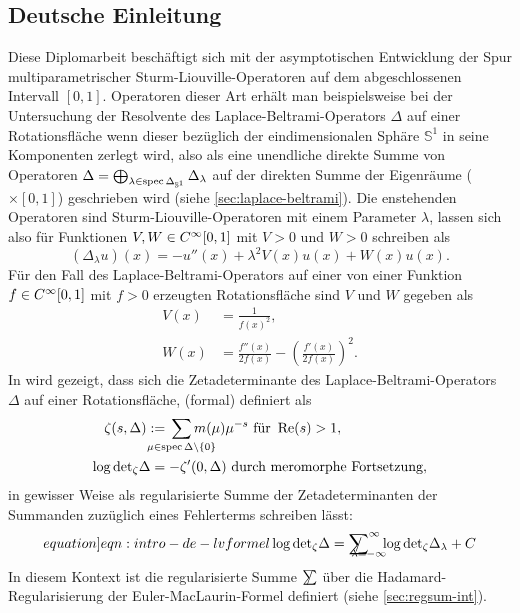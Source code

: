 \subsection{Deutsche Einleitung}
Diese Diplomarbeit beschäftigt sich mit der asymptotischen Entwicklung der Spur
multiparametrischer Sturm-Liouville-Operatoren auf dem abgeschlossenen Intervall
$[0,1]$.
%
Operatoren dieser Art erhält man beispielsweise bei der Untersuchung der
Resolvente des Laplace-Beltrami-Operators $\Delta$ auf einer Rotationsfläche
wenn dieser bezüglich der eindimensionalen Sphäre $\mathbb{S}^1$ in seine
Komponenten zerlegt wird, also als eine unendliche direkte Summe von Operatoren
$\Delta =
\bigoplus_{\lambda\in\operatorname{spec}\Delta_{{\mathbb{S}^{1}}}}\Delta_\lambda$ auf
der direkten Summe der Eigenräume ($\times[0,1]$) geschrieben wird (siehe
\cref{sec:laplace-beltrami}).
%
Die enstehenden Operatoren sind Sturm-Liouville-Operatoren mit einem Parameter
$\lambda$, lassen sich also für Funktionen $V,W\in C^\infty_{}{[0,1]}$ mit $V > 0$
und $W > 0$ schreiben als
\begin{equation*}
  (\Delta_\lambda u)(x) = -u''(x) + \lambda^2 V(x) u(x) + W(x) u(x).
\end{equation*}
Für den Fall des Laplace-Beltrami-Operators auf einer von einer Funktion
$f\in C^\infty_{}{[0,1]}$ mit $f>0$ erzeugten Rotationsfläche sind $V$ und $W$ gegeben
als
\begin{align*}
  V(x) &= \frac1{f(x)^2}, \\
  W(x) &= \frac{f''(x)}{2f(x)} - \left(\frac{f'(x)}{2f(x)}\right)^2.
\end{align*}
In \cite{LV13} wird gezeigt, dass sich die Zetadeterminante des
Laplace-Beltrami-Operators $\Delta$ auf einer Rotationsfläche, (formal) definiert
als
\begin{align*}
  \zeta(s,\Delta) := {} &
  \sum_{\mathclap{\mu\in\operatorname{spec}\Delta\setminus\{0\}}}
  m(\mu)\mu^{-s} \text{ für } \Re(s) > 1, \\
  \log\zdet \Delta = {} & {-\zeta'}(0,\Delta) \text{ durch meromorphe
Fortsetzung},
\end{align*}
in gewisser Weise als regularisierte Summe der Zetadeterminanten der Summanden
zuzüglich eines Fehlerterms schreiben lässt:
\begin{align*}
  \label[equation]{eqn:intro-de-lvformel}
  \log\zdet\Delta = \Regsum_{\mathclap{\lambda =
  -\infty}}^\infty\log\zdet\Delta_\lambda + C
\end{align*}
In diesem Kontext ist die regularisierte Summe $\slashed{\sum}$ über die
Hadamard-Regularisierung der Euler-MacLaurin-Formel
definiert (siehe \cref{sec:regsum-int}).

